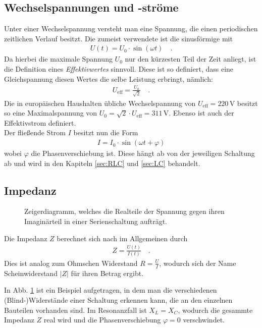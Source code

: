 \documentclass[12pt,a4paper,titlepage,headinclude,bibtotoc]{scrartcl}
\begin{document}
\subsection{Wechselspannungen und -ströme}
Unter einer Wechselspannung versteht man eine Spannung, die einen periodischen zeitlichen Verlauf besitzt.
Die zumeist verwendete ist die sinusförmige mit 
\begin{align*}
U(t)=U_0\cdot\sin(\omega t)\quad .
\end{align*}
Da hierbei die maximale Spannung $U_0$ nur den kürzesten Teil der Zeit anliegt, ist die Definition eines \emph{Effektivwertes} sinnvoll.
Diese ist so definiert, dass eine Gleichspannung diesen Wertes die selbe Leistung erbringt, nämlich:
\begin{align*}
U_\text{eff}=\frac{U_0}{\sqrt2}\quad .
\end{align*}
Die in europäischen Haushalten übliche Wechselspannung von $U_\text{eff}=220\,\si\volt$ besitzt so eine Maximalspannung von $U_0=\sqrt2\cdot U_\text{eff}=311\,\si\volt$.
Ebenso ist auch der Effektivstrom definiert.\\

Der fließende Strom $I$ besitzt nun die Form
\begin{align*}
I=I_0\cdot\sin(\omega t+\varphi)
\end{align*}
wobei $\varphi$ die Phasenverschiebung ist.
Diese hängt ab von der jeweiligen Schaltung ab und wird in den Kapiteln \ref{sec:RLC} und \ref{sec:LC} behandelt.

\subsection{Impedanz}
\label{sec:impedanz}
\begin{figure}[!h]
\centering

\caption{Zeigerdiagramm, welches die Realteile der Spannung gegen ihren Imaginärteil in einer Serienschaltung aufträgt.}
\label{fig:zeiger}
\end{figure}
Die Impedanz $Z$ berechnet sich nach \cite[S. 236]{nolting3} im Allgemeinen durch
\begin{align*}
Z=\frac{U(t)}{I(t)}\quad .
\end{align*}
Dies ist analog zum Ohmschen Widerstand $R=\frac{U}{I}$, wodurch sich der Name Scheinwiderstand $|Z|$ für ihren Betrag ergibt.

In Abb. \ref{fig:zeiger} ist ein Beispiel aufgetragen, in dem man die verschiedenen (Blind-)Widerstände einer Schaltung erkennen kann, die an den einzelnen Bauteilen vorhanden sind.
Im Resonanzfall ist $X_L=X_C$, wodurch die gesammte Impedanz $Z$ real wird und die Phasenverschiebung $\varphi=0$ verschwindet.
\end{document}
